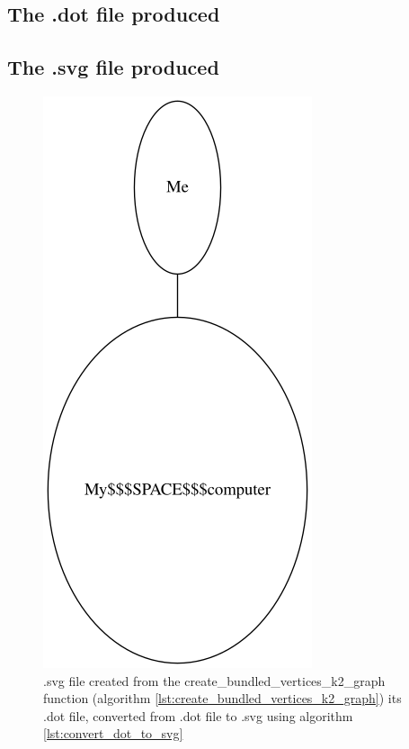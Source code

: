 

\subsection{The .dot file produced}



\subsection{The .svg file produced}

\begin{figure}[!htbp]
  \includegraphics[]{create_bundled_vertices_k2_graph.png}
  \caption{
    .svg file created from the create\_bundled\_vertices\_k2\_graph function 
    (algorithm \ref{lst:create_bundled_vertices_k2_graph}) its .dot file, 
    converted from .dot file to .svg 
    using algorithm \ref{lst:convert_dot_to_svg}
  }
  \label{fig:create_bundled_vertices_k2_graph.svg}
\end{figure}

